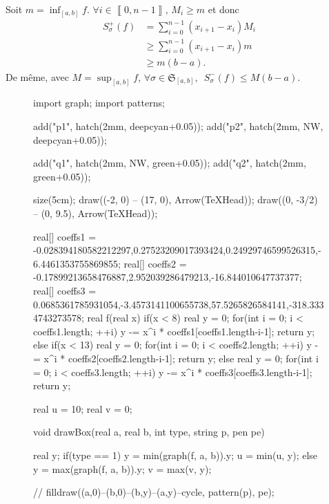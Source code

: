 \begin{multicols}{2}
	\begin{rmk}
		Soit $m = \inf_{[a,b]} f$. $\forall  i \in \left\llbracket 0,n-1 \right\rrbracket,\,M_i \ge m$ et donc
		\begin{align*}
			S_\sigma^+(f) &= \sum_{i=0}^{n-1} (x_{i+1}-x_i)M_i \\
			&\ge \sum_{i=0}^{n-1} (x_{i+1}-x_i) m\\
			&\ge m(b-a).
		\end{align*}
		De même, avec $M = \sup_{[a,b]} f$, $\forall \sigma \in \mathfrak{S}_{[a,b]},$~$S_\sigma^-(f) \le M(b-a)$.

		\columnbreak
		\vfill\null

		\begin{figure}[H]
			\centering
			\begin{asy}
				import graph;
				import patterns;

				add("p1", hatch(2mm, deepcyan+0.05));
				add("p2", hatch(2mm, NW, deepcyan+0.05));

				add("q1", hatch(2mm, NW, green+0.05));
				add("q2", hatch(2mm, green+0.05));

				size(5cm);
				draw((-2, 0) -- (17, 0), Arrow(TeXHead));
				draw((0, -3/2) -- (0, 9.5), Arrow(TeXHead));

				real[] coeffs1 = {-0.028394180582212297,0.27523209017393424,0.24929746599526315,-6.4461353755869855};
				real[] coeffs2 = {-0.17899213658476887,2.952039286479213,-16.844010647737377};
				real[] coeffs3 = {0.0685361785931054,-3.4573141100655738,57.5265826584141,-318.3334743273578};
				real f(real x) {
					if(x < 8) {
						real y = 0;
						for(int i = 0; i < coeffs1.length; ++i) {
							y -= x^i * coeffs1[coeffs1.length-i-1];
						}
						return y;
					} else if(x < 13) {
						real y = 0;
						for(int i = 0; i < coeffs2.length; ++i) {
							y -= x^i * coeffs2[coeffs2.length-i-1];
						}
						return y;
					} else {
						real y = 0;
						for(int i = 0; i < coeffs3.length; ++i) {
							y -= x^i * coeffs3[coeffs3.length-i-1];
						}
						return y;
					}
				}

				real u = 10;
				real v = 0;

				void drawBox(real a, real b, int type, string p, pen pe) {
					real y;
					if(type == 1) {
						y = min(graph(f, a, b)).y;
						u = min(u, y);
					} else {
						y = max(graph(f, a, b)).y;
						v = max(v, y);
					}

					// filldraw((a,0)--(b,0)--(b,y)--(a,y)--cycle, pattern(p), pe);
				}


\end{asy}
\end{figure}
\end{rmk}
\end{multicols}
